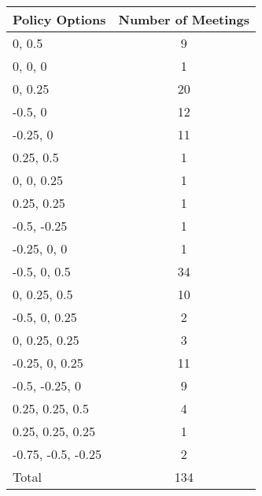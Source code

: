 \begin{tabular}{lc}
\hline\hline 
\addlinespace 
Policy Options & Number of Meetings \\ 
\hline 
0, 0.5 & 9 \\
0, 0, 0 & 1 \\
0, 0.25 & 20 \\
-0.5, 0 & 12 \\
-0.25, 0 & 11 \\
0.25, 0.5 & 1 \\
0, 0, 0.25 & 1 \\
0.25, 0.25 & 1 \\
-0.5, -0.25 & 1 \\
-0.25, 0, 0 & 1 \\
-0.5, 0, 0.5 & 34 \\
0, 0.25, 0.5 & 10 \\
-0.5, 0, 0.25 & 2 \\
0, 0.25, 0.25 & 3 \\
-0.25, 0, 0.25 & 11 \\
-0.5, -0.25, 0 & 9 \\
0.25, 0.25, 0.5 & 4 \\
0.25, 0.25, 0.25 & 1 \\
-0.75, -0.5, -0.25 & 2 \\
\addlinespace 
Total & 134 \\
\hline 
\end{tabular}